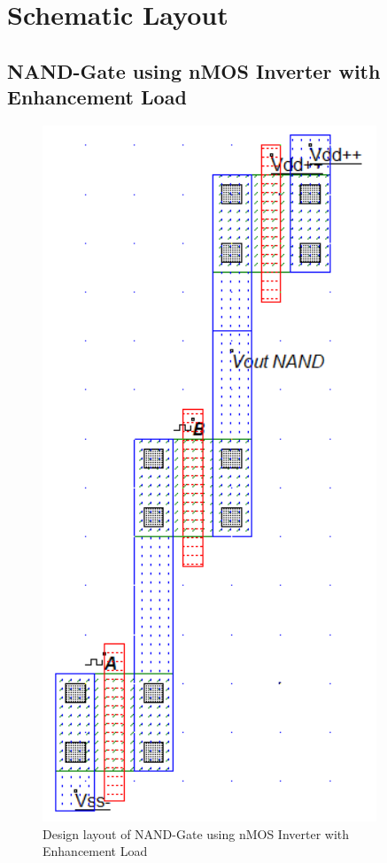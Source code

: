 \documentclass[a4paper,12pt]{article}
\begin{document}
	\section{Schematic Layout }
\subsection{NAND-Gate using nMOS Inverter with Enhancement Load}
\begin{figure}[H]
	\centering
	\includegraphics[width=0.6\linewidth]{Images5/1}
	\caption{Design layout of NAND-Gate using nMOS Inverter with Enhancement Load}
	\label{fig:1}
\end{figure}
\end{document}
